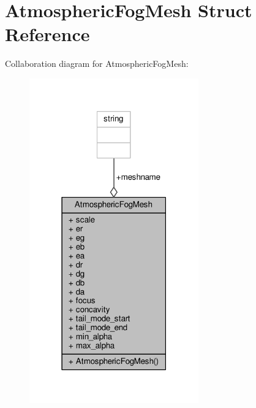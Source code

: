 \hypertarget{structAtmosphericFogMesh}{}\section{Atmospheric\+Fog\+Mesh Struct Reference}
\label{structAtmosphericFogMesh}


Collaboration diagram for Atmospheric\+Fog\+Mesh\+:
\nopagebreak
\begin{figure}[H]
\begin{center}
\leavevmode
\includegraphics[width=207pt]{dd/d11/structAtmosphericFogMesh__coll__graph}
\end{center}
\end{figure}
